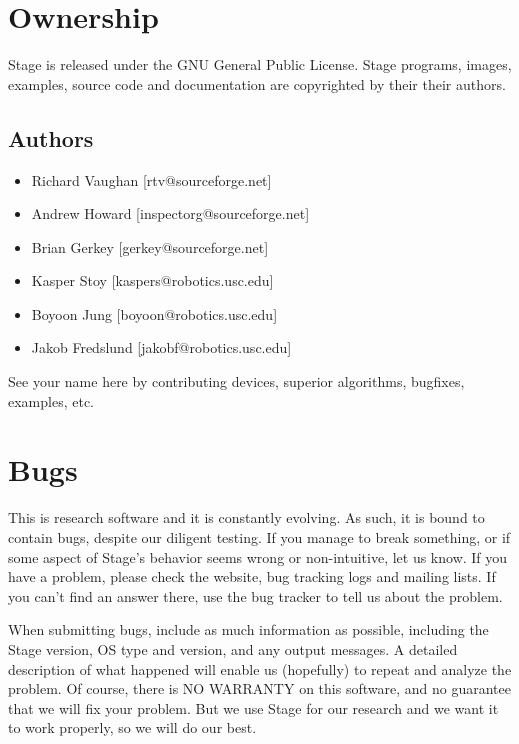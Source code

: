 \documentclass[11pt]{report}
\begin{document}
  \section{Ownership}

    Stage is released under the GNU General Public
    License. Stage programs, images, examples, source code and
    documentation are copyrighted by their their authors.

\subsection{Authors}
      \begin{itemize}
      \item[] Richard Vaughan [rtv@sourceforge.net]
      \item[] Andrew Howard [inspectorg@sourceforge.net]
      \item[] Brian Gerkey [gerkey@sourceforge.net]
      \item[] Kasper Stoy [kaspers@robotics.usc.edu]
      \item[] Boyoon Jung [boyoon@robotics.usc.edu]
      \item[] Jakob Fredslund [jakobf@robotics.usc.edu]
      \end{itemize}

	See your name here by contributing devices, superior
	algorithms, bugfixes, examples, etc.

  \section{Bugs}
  
    This is research software and it is constantly evolving.  As such,
    it is bound to contain bugs, despite our diligent testing.  If you
    manage to break something, or if some aspect of Stage's behavior
    seems wrong or non-intuitive, let us know. If you have a problem,
    please check the website, bug tracking logs and mailing lists. If
    you can't find an answer there, use the bug tracker to tell us
    about the problem.

When submitting bugs, include as much information as possible,
    including the Stage version, OS type and version, and any output
    messages.  A detailed description of what happened will enable us
    (hopefully) to repeat and analyze the problem.  Of course, there
    is NO WARRANTY on this software, and no guarantee that we will fix
    your problem.  But we use Stage for our research and we want it to
    work properly, so we will do our best.
\end{document}
